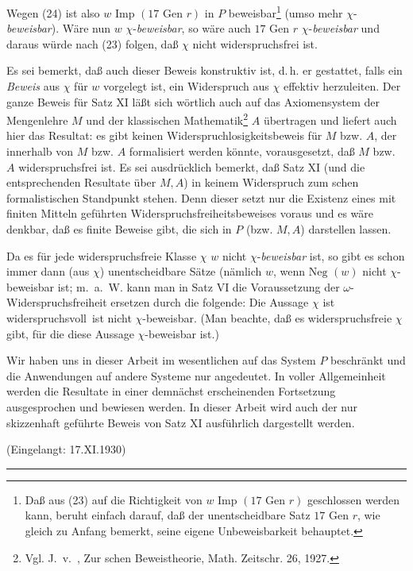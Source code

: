 \documentclass[draft]{scrartcl}
\newcounter{commentaryNumber}
\newcommand{\mnote}[1]{%
		\marginpar{%
			\textcolor{darkgray}{%
				\small\arabic{commentaryNumber}: #1}%
		}%
		\stepcounter{commentaryNumber}%
	}
\newcommand{\mnote}[1]{}
\let\oldleft\left
\let\oldright\right
\def\left#1{%
	    \global\advance\bracketnum1\relax 
		\colorlet{temp}{.}%
		    \csname bracketcolor\the\bracketnum\endcsname
			\oldleft#1%
			    \color{temp}%
	}
\def\right#1{%
	    \colorlet{temp}{.}%
		\csname bracketcolor\the\bracketnum\endcsname
		    \oldright#1%
			\global\advance\bracketnum-1\relax
			    \color{temp}%
	}
\def\left#1{#1}
\def\right#1{#1}
\begin{document}
Wegen (24) ist also $w\text{ Imp } \left(17\text{ Gen }r\right)$
in $P$ beweisbar\footnote{Daß aus (23) auf die Richtigkeit von
$w\text{ Imp }\left(17\text{ Gen } r\right)$
geschlossen werden kann, beruht einfach darauf, daß der unentscheidbare Satz%
$17\text{ Gen }r$, wie gleich zu Anfang bemerkt, seine eigene Unbeweisbarkeit behauptet.} 
(umso mehr $\chi$-\textit{beweisbar}). Wäre nun $w$ $\chi$-\textit{beweisbar}, 
so wäre auch $17\text{ Gen }r$ $\chi$-\textit{beweisbar} und daraus würde nach (23) 
folgen, daß $\chi$ nicht widerspruchsfrei ist.

Es sei bemerkt, daß auch dieser Beweis konstruktiv ist, d.\,h. er gestattet, falls ein \textit{Beweis} aus $\chi$ für $w$ vorgelegt ist, ein Widerspruch aus $\chi$ effektiv herzuleiten. Der ganze Beweis für Satz XI läßt sich wörtlich auch auf das Axiomensystem der Mengenlehre $M$ und der klassischen Mathematik\footnote{Vgl. J.~v.~, Zur schen Beweistheorie, Math. Zeitschr. 26, 1927.}
$A$ übertragen und liefert auch hier das Resultat: es gibt keinen Widerspruchlosigkeitsbeweis für $M$ bzw. $A$, der innerhalb von $M$ bzw. $A$ formalisiert werden könnte, vorausgesetzt, daß $M$ bzw. $A$ widerspruchsfrei ist. Es sei ausdrücklich bemerkt, daß Satz XI (und die entsprechenden Resultate über $M, A$) in keinem Widerspruch zum schen formalistischen Standpunkt stehen. Denn dieser setzt nur die Existenz eines mit finiten Mitteln geführten Widerspruchsfreiheitsbeweises voraus und es wäre denkbar, daß es finite Beweise gibt, die sich in $P$ (bzw. $M, A$)  darstellen lassen.

Da es für jede widerspruchsfreie Klasse $\chi$ $w$ nicht 
$\chi$-\textit{beweisbar} ist, so gibt es schon immer dann 
(aus $\chi$) unentscheidbare Sätze (nämlich $w$, wenn 
$\text{Neg }\left(w\right)$ nicht $\chi$-beweisbar ist; 
m.~a.~W. kann man in Satz VI die Voraussetzung der
$\omega$-Widerspruchsfreiheit ersetzen durch die folgende: 
Die Aussage \glqq $\chi$ ist widerspruchsvoll\grqq\ ist 
nicht $\chi$-beweisbar. (Man beachte, daß es widerspruchsfreie 
$\chi$ gibt, für die diese Aussage $\chi$-beweisbar ist.)

Wir haben uns in dieser Arbeit im wesentlichen auf das System $P$ 
beschränkt und die Anwendungen auf andere Systeme nur angedeutet. 
In voller Allgemeinheit werden die Resultate in einer demnächst 
erscheinenden Fortsetzung ausgesprochen und bewiesen werden. 
In dieser Arbeit wird auch der nur skizzenhaft geführte Beweis
von Satz XI ausführlich dargestellt werden.

\begin{center}
(Eingelangt: 17.XI.1930)
\end{center}
\vspace{0.5cm}
\begin{center}
\rule{2cm}{0.01cm}
\end{center}
\end{document}
